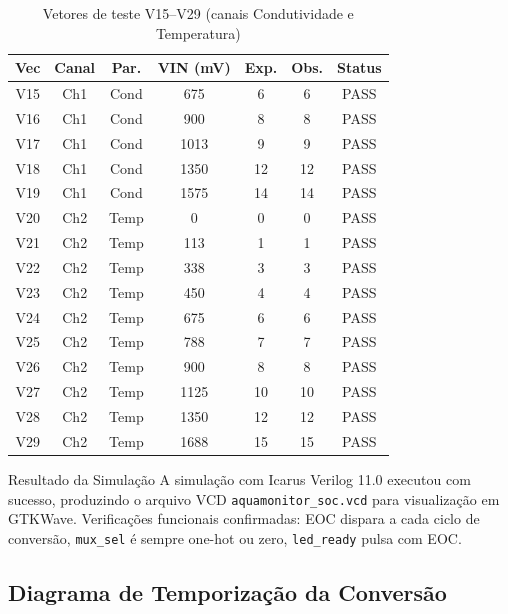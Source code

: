 \documentclass[12pt,a4paper]{article}
\begin{document}
\begin{table}[H]
  \centering
  \caption{Vetores de teste V15--V29 (canais Condutividade e Temperatura)}
  \label{tab:testvectors_b}
  \small
  \begin{tabular}{ccccccc}
    \toprule
    \textbf{Vec} & \textbf{Canal} & \textbf{Par.} &
    \textbf{VIN (mV)} & \textbf{Exp.} & \textbf{Obs.} & \textbf{Status} \\
    \midrule
    V15 & Ch1 & Cond &  675 &  6 &  6 & PASS \\
    \rowcolor{bwlight}
    V16 & Ch1 & Cond &  900 &  8 &  8 & PASS \\
    V17 & Ch1 & Cond & 1013 &  9 &  9 & PASS \\
    \rowcolor{bwlight}
    V18 & Ch1 & Cond & 1350 & 12 & 12 & PASS \\
    V19 & Ch1 & Cond & 1575 & 14 & 14 & PASS \\
    \rowcolor{bwlight}
    V20 & Ch2 & Temp &    0 &  0 &  0 & PASS \\
    V21 & Ch2 & Temp &  113 &  1 &  1 & PASS \\
    \rowcolor{bwlight}
    V22 & Ch2 & Temp &  338 &  3 &  3 & PASS \\
    V23 & Ch2 & Temp &  450 &  4 &  4 & PASS \\
    \rowcolor{bwlight}
    V24 & Ch2 & Temp &  675 &  6 &  6 & PASS \\
    V25 & Ch2 & Temp &  788 &  7 &  7 & PASS \\
    \rowcolor{bwlight}
    V26 & Ch2 & Temp &  900 &  8 &  8 & PASS \\
    V27 & Ch2 & Temp & 1125 & 10 & 10 & PASS \\
    \rowcolor{bwlight}
    V28 & Ch2 & Temp & 1350 & 12 & 12 & PASS \\
    V29 & Ch2 & Temp & 1688 & 15 & 15 & PASS \\
    \bottomrule
  \end{tabular}
\end{table}

\begin{infobox}{Resultado da Simulação}
A simulação com Icarus Verilog 11.0 executou com sucesso, produzindo o arquivo
VCD \texttt{aquamonitor\_soc.vcd} para visualização em GTKWave.
Verificações funcionais confirmadas: EOC dispara a cada ciclo de conversão,
\texttt{mux\_sel} é sempre one-hot ou zero, \texttt{led\_ready} pulsa com EOC.
\end{infobox}

\subsection{Diagrama de Temporização da Conversão}
\end{document}
